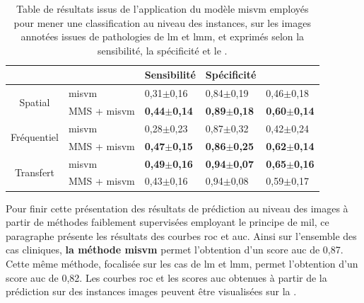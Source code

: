 \begin{table}[H]
    \centering
    \begin{tabular}{cllll}
        \toprule
        \multicolumn{1}{l}{}         &                      & Sensibilité               & Spécificité               & \Fscore{}                 \\ \midrule
        \multirow{2}{*}{Spatial}     & \gls{misvm}          & 0,31$\pm$0,16             & 0,84$\pm$0,19             & 0,46$\pm$0,18             \\
                                     & MMS + \gls{misvm}    & \textbf{0,44$\pm$0,14}    & \textbf{0,89$\pm$0,18}    & \textbf{0,60$\pm$0,14}    \\ \midrule
        \multirow{2}{*}{Fréquentiel} & \gls{misvm}          & 0,28$\pm$0,23             & 0,87$\pm$0,32             & 0,42$\pm$0,24             \\
                                     & MMS + \gls{misvm}    & \textbf{0,47$\pm$0,15}    & \textbf{0,86$\pm$0,25}    & \textbf{0,62$\pm$0,14}    \\ \midrule
        \multirow{2}{*}{Transfert}   & \gls{misvm}          & \textbf{0,49$\pm$0,16}    & \textbf{0,94$\pm$0,07}    & \textbf{0,65$\pm$0,16}    \\
                                     & MMS + \gls{misvm}    & 0,43$\pm$0,16             & 0,94$\pm$0,08             & 0,59$\pm$0,17             \\ \bottomrule
    \end{tabular}
    \caption{Table de résultats issus de l'application du modèle \gls{misvm} employés pour mener une classification au niveau des instances, sur les images annotées issues de pathologies de \gls{lm} et \gls{lmm}, et exprimés selon la sensibilité, la spécificité et le \fscore{}.}
    \label{tab:results_lesion_classification_weakly_image_lm}
\end{table}

Pour finir cette présentation des résultats de prédiction au niveau des images à partir de méthodes faiblement supervisées employant le principe de \gls{mil}, ce paragraphe présente les résultats des courbes \gls{roc} et \gls{auc}. Ainsi sur l'ensemble des cas cliniques, \textbf{la méthode \gls{misvm}} permet l'obtention d'un score \gls{auc} de 0,87. Cette même méthode, focalisée sur les cas de \gls{lm} et \gls{lmm}, permet l'obtention d'un score \gls{auc} de 0,82. Les courbes \gls{roc} et les scores \gls{auc} obtenues à partir de la prédiction sur des instances images peuvent être visualisées sur la .\par

